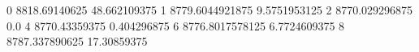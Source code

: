 0 8818.69140625 48.662109375
1 8779.6044921875 9.5751953125
2 8770.029296875 0.0
4 8770.43359375 0.404296875
6 8776.8017578125 6.7724609375
8 8787.337890625 17.30859375
